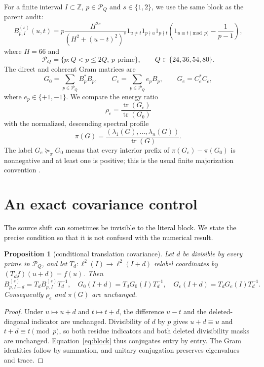 \documentclass[10pt]{article}
\newtheorem{proposition}{Proposition}
\newcommand{\PP}{\mathcal P}
\newcommand{\tr}{\operatorname{tr}}
\begin{document}
For a finite interval $I\subset\mathbb Z$, $p\in\PP_Q$ and $s\in\{1,2\}$,
we use the same block as the parent audit:
\begin{equation}
 B_{p,I}^{(s)}(u,t)=p\frac{H^{2s}}{(H^2+(u-t)^2)^s}
 1_{u\ne t}1_{p\nmid u}1_{p\nmid t}
 \left(1_{u\equiv t\pmod p}-\frac{1}{p-1}\right),
 \label{eq:block}
\end{equation}
where $H=66$ and
\[
 \PP_Q=\{p: Q<p\leq 2Q,\ p\text{ prime}\},\qquad
 Q\in\{24,36,54,80\}.
\]
The direct and coherent Gram matrices are
\begin{equation}
 G_0=\sum_{p\in\PP_Q}B_p^*B_p,
 \qquad
 C_e=\sum_{p\in\PP_Q}e_pB_p,
 \qquad G_e=C_e^*C_e,
 \label{eq:grams}
\end{equation}
where $e_p\in\{+1,-1\}$.  We compare the energy ratio
\[
 \rho_e=\frac{\tr(G_e)}{\tr(G_0)}
\]
with the normalized, descending spectral profile
\[
 \pi(G)=\frac{(\lambda_1(G),\ldots,\lambda_n(G))}{\tr(G)}.
\]
The label $G_e\succcurlyeq_\pi G_0$ means that every interior prefix of
$\pi(G_e)-\pi(G_0)$ is nonnegative and at least one is positive; this is the
usual finite majorization convention \cite{marshall2011,bhatia1997}.

\section{An exact covariance control}

The source shift can sometimes be invisible to the literal block.  We state
the precise condition so that it is not confused with the numerical result.

\begin{proposition}[conditional translation covariance]
Let $d$ be divisible by every prime in $\PP_Q$, and let
$T_d:\ell^2(I)\to\ell^2(I+d)$ relabel coordinates by
$(T_df)(u+d)=f(u)$.  Then
\[
 B_{p,I+d}^{(s)}=T_dB_{p,I}^{(s)}T_d^{-1},\quad
 G_0(I+d)=T_dG_0(I)T_d^{-1},\quad
 G_e(I+d)=T_dG_e(I)T_d^{-1}.
\]
Consequently $\rho_e$ and $\pi(G)$ are unchanged.
\end{proposition}

\begin{proof}
Under $u\mapsto u+d$ and $t\mapsto t+d$, the difference $u-t$ and the
deleted-diagonal indicator are unchanged.  Divisibility of $d$ by $p$ gives
$u+d\equiv u$ and $t+d\equiv t\pmod p$, so both residue indicators and both
deleted divisibility masks are unchanged.  Equation~\eqref{eq:block} thus
conjugates entry by entry.  The Gram identities follow by summation, and
unitary conjugation preserves eigenvalues and trace.
\end{proof}
\end{document}
